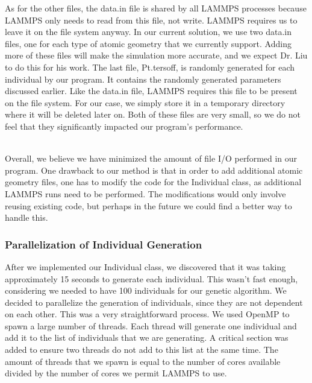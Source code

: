 \documentclass[letterpaper, 12pt]{article}
\begin{document}
\begin{flushleft}
As for the other files, the data.in file is shared by all LAMMPS processes because LAMMPS only needs to read from this file, not write. LAMMPS requires us to leave it on the file system anyway. In our current solution, we use two data.in files, one for each type of atomic geometry that we currently support. Adding more of these files will make the simulation more accurate, and we expect Dr. Liu to do this for his work. The last file, Pt.tersoff, is randomly generated for each individual by our program. It contains the randomly generated parameters discussed earlier. Like the data.in file, LAMMPS requires this file to be present on the file system. For our case, we simply store it in a temporary directory where it will be deleted later on. Both of these files are very small, so we do not feel that they significantly impacted our program's performance. \\
~\newline

Overall, we believe we have minimized the amount of file I/O performed in our program. One drawback to our method is that in order to add additional atomic geometry files, one has to modify the code for the Individual class, as additional LAMMPS runs need to be performed. The modifications would only involve reusing existing code, but perhaps in the future we could find a better way to handle this. 

\subsubsection*{Parallelization of Individual Generation}

After we implemented our Individual class, we discovered that it was taking approximately 15 seconds to generate each individual. This wasn't fast enough, considering we needed to have 100 individuals for our genetic algorithm. We decided to parallelize the generation of individuals, since they are not dependent on each other. This was a very straightforward process. We used OpenMP to spawn a large number of threads. Each thread will generate one individual and add it to the list of individuals that we are generating. A critical section was added to ensure two threads do not add to this list at the same time. The amount of threads that we spawn is equal to the number of cores available divided by the number of cores we permit LAMMPS to use. \\
~\newline

 



\end{flushleft}
\end{document}
